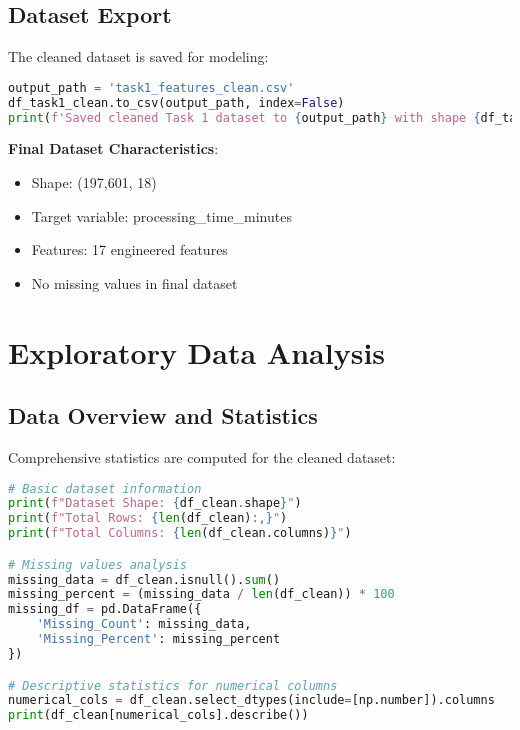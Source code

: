 \documentclass[12pt,a4paper]{article}
\begin{document}
\subsection{Dataset Export}

The cleaned dataset is saved for modeling:

\begin{lstlisting}[language=Python, caption=Dataset Export]
output_path = 'task1_features_clean.csv'
df_task1_clean.to_csv(output_path, index=False)
print(f'Saved cleaned Task 1 dataset to {output_path} with shape {df_task1_clean.shape}')
\end{lstlisting}

\textbf{Final Dataset Characteristics}:
\begin{itemize}
    \item Shape: (197,601, 18)
    \item Target variable: processing\_time\_minutes
    \item Features: 17 engineered features
    \item No missing values in final dataset
\end{itemize}

\section{Exploratory Data Analysis}

\subsection{Data Overview and Statistics}

Comprehensive statistics are computed for the cleaned dataset:

\begin{lstlisting}[language=Python, caption=Dataset Statistics]
# Basic dataset information
print(f"Dataset Shape: {df_clean.shape}")
print(f"Total Rows: {len(df_clean):,}")
print(f"Total Columns: {len(df_clean.columns)}")

# Missing values analysis
missing_data = df_clean.isnull().sum()
missing_percent = (missing_data / len(df_clean)) * 100
missing_df = pd.DataFrame({
    'Missing_Count': missing_data,
    'Missing_Percent': missing_percent
})

# Descriptive statistics for numerical columns
numerical_cols = df_clean.select_dtypes(include=[np.number]).columns
print(df_clean[numerical_cols].describe())
\end{lstlisting}
\end{document}
